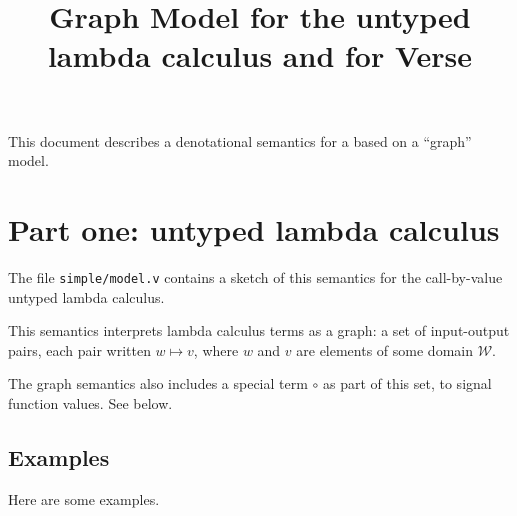 \documentclass{article}
\title{Graph Model for the untyped lambda calculus and for 
Verse}
\theoremstyle{definition}
\begin{document}
\maketitle

This document describes a denotational semantics for a
based on a ``graph'' model. 

\section{Part one: untyped lambda calculus}


The file \texttt{simple/model.v} contains a sketch of this semantics for the
call-by-value untyped lambda calculus.

This semantics interprets lambda calculus terms as a graph: a set of
input-output pairs, each pair written $w \mapsto v$, where $w$ and $v$
are elements of some domain $\mathcal{W}$. 

The graph semantics also includes a special term $\circ$ as part of this set,
to signal function values. See below.

\subsection{Examples}

Here are some examples.
\end{document}

